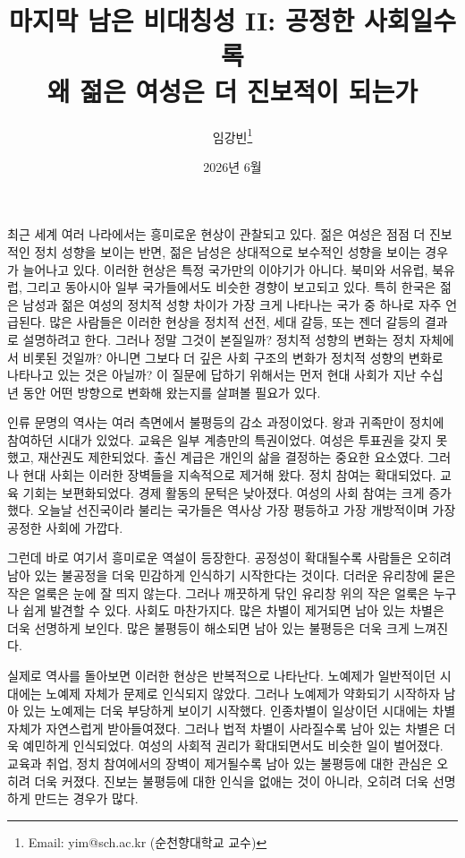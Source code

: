 \documentclass[12pt]{article}
\title{마지막 남은 비대칭성 II: 공정한 사회일수록 \\왜 젊은 여성은 더 진보적이 되는가}
\author{임강빈\thanks{Email: yim@sch.ac.kr (순천향대학교 교수)}}
\date{2026년 6월}
\begin{document}
\maketitle

최근 세계 여러 나라에서는 흥미로운 현상이 관찰되고 있다. 젊은 여성은 점점 더 진보적인 정치 성향을 보이는 반면, 젊은 남성은 상대적으로 보수적인 성향을 보이는 경우가 늘어나고 있다. 이러한 현상은 특정 국가만의 이야기가 아니다. 북미와 서유럽, 북유럽, 그리고 동아시아 일부 국가들에서도 비슷한 경향이 보고되고 있다. 특히 한국은 젊은 남성과 젊은 여성의 정치적 성향 차이가 가장 크게 나타나는 국가 중 하나로 자주 언급된다. 많은 사람들은 이러한 현상을 정치적 선전, 세대 갈등, 또는 젠더 갈등의 결과로 설명하려고 한다. 그러나 정말 그것이 본질일까? 정치적 성향의 변화는 정치 자체에서 비롯된 것일까? 아니면 그보다 더 깊은 사회 구조의 변화가 정치적 성향의 변화로 나타나고 있는 것은 아닐까? 이 질문에 답하기 위해서는 먼저 현대 사회가 지난 수십 년 동안 어떤 방향으로 변화해 왔는지를 살펴볼 필요가 있다.

인류 문명의 역사는 여러 측면에서 불평등의 감소 과정이었다. 왕과 귀족만이 정치에 참여하던 시대가 있었다.
교육은 일부 계층만의 특권이었다. 여성은 투표권을 갖지 못했고, 재산권도 제한되었다. 출신 계급은 개인의 삶을 결정하는 중요한 요소였다. 그러나 현대 사회는 이러한 장벽들을 지속적으로 제거해 왔다. 정치 참여는 확대되었다. 교육 기회는 보편화되었다. 경제 활동의 문턱은 낮아졌다. 여성의 사회 참여는 크게 증가했다.
오늘날 선진국이라 불리는 국가들은 역사상 가장 평등하고 가장 개방적이며 가장 공정한 사회에 가깝다.

그런데 바로 여기서 흥미로운 역설이 등장한다. 공정성이 확대될수록 사람들은 오히려 남아 있는 불공정을 더욱 민감하게 인식하기 시작한다는 것이다. 더러운 유리창에 묻은 작은 얼룩은 눈에 잘 띄지 않는다. 그러나 깨끗하게 닦인 유리창 위의 작은 얼룩은 누구나 쉽게 발견할 수 있다. 사회도 마찬가지다. 많은 차별이 제거되면 남아 있는 차별은 더욱 선명하게 보인다. 많은 불평등이 해소되면 남아 있는 불평등은 더욱 크게 느껴진다.

실제로 역사를 돌아보면 이러한 현상은 반복적으로 나타난다. 노예제가 일반적이던 시대에는 노예제 자체가 문제로 인식되지 않았다. 그러나 노예제가 약화되기 시작하자 남아 있는 노예제는 더욱 부당하게 보이기 시작했다. 인종차별이 일상이던 시대에는 차별 자체가 자연스럽게 받아들여졌다. 그러나 법적 차별이 사라질수록 남아 있는 차별은 더욱 예민하게 인식되었다. 여성의 사회적 권리가 확대되면서도 비슷한 일이 벌어졌다. 교육과 취업, 정치 참여에서의 장벽이 제거될수록 남아 있는 불평등에 대한 관심은 오히려 더욱 커졌다. 진보는 불평등에 대한 인식을 없애는 것이 아니라, 오히려 더욱 선명하게 만드는 경우가 많다.
\end{document}
